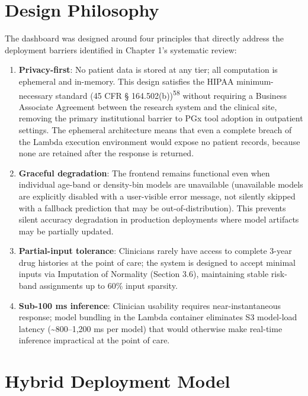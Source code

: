 \documentclass[
  12pt,
]{book}
\providecommand{\tightlist}{%
  \setlength{\itemsep}{0pt}\setlength{\parskip}{0pt}}
\begin{document}
\section{Design Philosophy}\label{design-philosophy}

The dashboard was designed around four principles that directly address
the deployment barriers identified in Chapter 1's systematic review:

\begin{enumerate}
\def\labelenumi{\arabic{enumi}.}
\tightlist
\item
  \textbf{Privacy-first}: No patient data is stored at any tier; all
  computation is ephemeral and in-memory. This design satisfies the
  HIPAA minimum-necessary standard (45 CFR §
  164.502(b))\textsuperscript{58} without requiring a Business Associate
  Agreement between the research system and the clinical site, removing
  the primary institutional barrier to PGx tool adoption in outpatient
  settings. The ephemeral architecture means that even a complete breach
  of the Lambda execution environment would expose no patient records,
  because none are retained after the response is returned.
\item
  \textbf{Graceful degradation}: The frontend remains functional even
  when individual age-band or density-bin models are unavailable
  (unavailable models are explicitly disabled with a user-visible error
  message, not silently skipped with a fallback prediction that may be
  out-of-distribution). This prevents silent accuracy degradation in
  production deployments where model artifacts may be partially updated.
\item
  \textbf{Partial-input tolerance}: Clinicians rarely have access to
  complete 3-year drug histories at the point of care; the system is
  designed to accept minimal inputs via Imputation of Normality (Section
  3.6), maintaining stable risk-band assignments up to 60\% input
  sparsity.
\item
  \textbf{Sub-100 ms inference}: Clinician usability requires
  near-instantaneous response; model bundling in the Lambda container
  eliminates S3 model-load latency (\textasciitilde800--1,200 ms per
  model) that would otherwise make real-time inference impractical at
  the point of care.
\end{enumerate}

\section{Hybrid Deployment Model}\label{hybrid-deployment-model}
\end{document}
